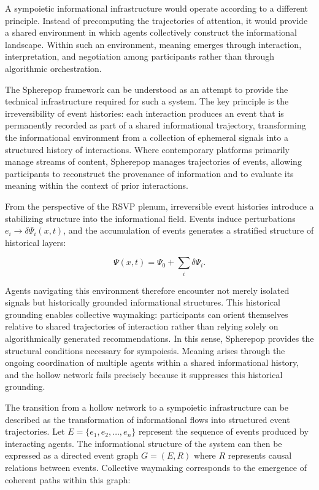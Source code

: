 \documentclass[12pt,a4paper]{article}
\begin{document}
A sympoietic informational infrastructure would operate according to a different principle.
Instead of precomputing the trajectories of attention, it would provide a shared environment
in which agents collectively construct the informational landscape. Within such an environment,
meaning emerges through interaction, interpretation, and negotiation among participants rather
than through algorithmic orchestration.

The Spherepop framework can be understood as an attempt to provide the technical infrastructure
required for such a system. The key principle is the irreversibility of event histories: each
interaction produces an event that is permanently recorded as part of a shared informational
trajectory, transforming the informational environment from a collection of ephemeral signals
into a structured history of interactions. Where contemporary platforms primarily manage streams
of content, Spherepop manages trajectories of events, allowing participants to reconstruct the
provenance of information and to evaluate its meaning within the context of prior interactions.

From the perspective of the RSVP plenum, irreversible event histories introduce a stabilizing
structure into the informational field. Events induce perturbations $e_i \to \delta\Psi_i(x,t)$,
and the accumulation of events generates a stratified structure of historical layers:

\[
\Psi(x,t) = \Psi_0 + \sum_i \delta\Psi_i.
\]

Agents navigating this environment therefore encounter not merely isolated signals but
historically grounded informational structures. This historical grounding enables collective
waymaking: participants can orient themselves relative to shared trajectories of interaction
rather than relying solely on algorithmically generated recommendations. In this sense,
Spherepop provides the structural conditions necessary for sympoiesis. Meaning arises through
the ongoing coordination of multiple agents within a shared informational history, and the
hollow network fails precisely because it suppresses this historical grounding.

The transition from a hollow network to a sympoietic infrastructure can be described as the
transformation of informational flows into structured event trajectories. Let
$E = \{e_1, e_2, \dots, e_n\}$ represent the sequence of events produced by interacting
agents. The informational structure of the system can then be expressed as a directed event
graph $G = (E, R)$ where $R$ represents causal relations between events. Collective waymaking
corresponds to the emergence of coherent paths within this graph:
\end{document}
